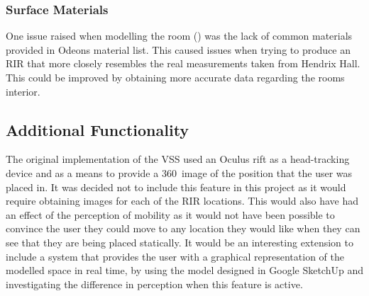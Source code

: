 \documentclass[../../main.tex]{subfiles}
\begin{document}
		\subsubsection{Surface Materials}
			One issue raised when modelling the room () was the lack of common materials provided in Odeons material list. This caused issues when trying to produce an \ac{RIR} that more closely resembles the real measurements taken from Hendrix Hall. This could be improved by obtaining more accurate data regarding the rooms interior.

	\subsection{Additional Functionality}
		The original implementation of the \ac{VSS} used an Oculus rift as a head-tracking device and as a means to provide a 360\textdegree~image of the position that the user was placed in. It was decided not to include this feature in this project as it would require obtaining images for each of the \ac{RIR} locations. This would also have had an effect of the perception of mobility as it would not have been possible to convince the user they could move to any location they would like when they can see that they are being placed statically. It would be an interesting extension to include a system that provides the user with a graphical representation of the modelled space in real time, by using the model designed in Google SketchUp and investigating the difference in perception when this feature is active.








\label{realRIRs}
\end{document}
